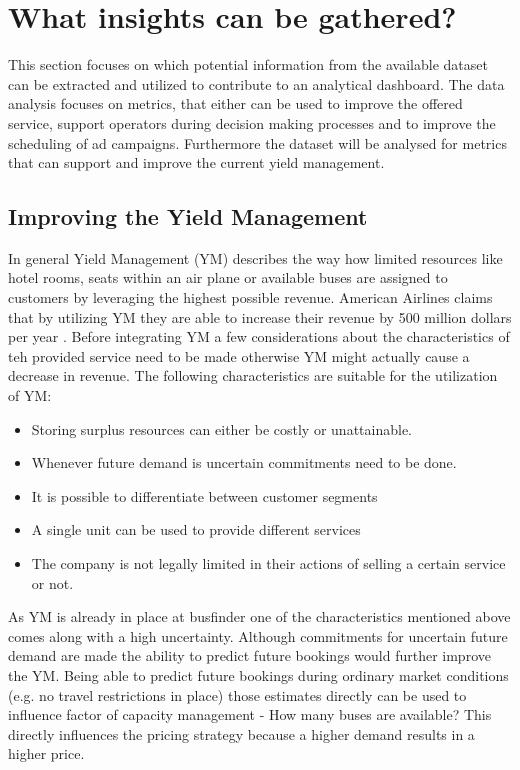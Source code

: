 %
%
% 
% 
% 


\chapter{What insights can be gathered?}
This section focuses on which potential information from the available dataset can be extracted and utilized to contribute to an analytical dashboard. The data analysis focuses on metrics, that either can be used to improve the offered service, support operators during decision making processes and to improve the scheduling of ad campaigns. Furthermore the dataset will be analysed for metrics that can support and improve the current yield management. 


\section{Improving the Yield Management}
In general Yield Management (YM) describes the way how limited resources like hotel rooms, seats within an air plane or available buses are assigned to customers by leveraging the highest possible revenue. American Airlines claims that by utilizing YM they are able to increase their revenue by 500 million dollars per year \cite{ym_practice}. Before integrating YM a few considerations about the characteristics of teh provided service need to be made otherwise YM might actually cause a decrease in revenue. The following characteristics are suitable for the utilization of YM:\cite{ym_practice}
\begin{itemize}
  \item Storing surplus resources can either be costly or unattainable. 
  \item Whenever future demand is uncertain commitments need to be done.
  \item It is possible to differentiate between customer segments
  \item A single unit can be used to provide different services 
  \item The company is not legally limited in their actions of selling a certain service or not.
\end{itemize}
As YM is already in place at busfinder one of the characteristics mentioned above comes along with a high uncertainty. Although commitments for uncertain future demand are made the ability to predict future bookings would further improve the YM. Being able to predict future bookings during ordinary market conditions (e.g. no travel restrictions in place) those estimates directly can be used to influence factor of capacity management - How many buses are available? This directly influences the pricing strategy because a higher demand results in a higher price.

